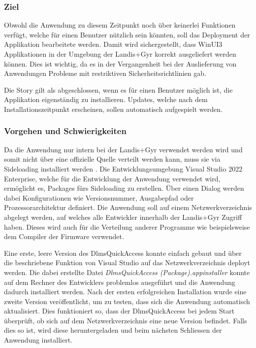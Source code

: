 \subsubsection{Ziel}
Obwohl die Anwendung zu diesem Zeitpunkt noch über keinerlei Funktionen verfügt, welche für einen Benutzer nützlich sein könnten, soll das Deployment der Applikation bearbeitete werden.
Damit wird sichergestellt, dass WinUI3 Applikationen in der Umgebung der Landis+Gyr korrekt ausgeliefert werden können.
Dies ist wichtig, da es in der Vergangenheit bei der Auslieferung von Anwendungen Probleme mit restriktiven Sicherheitsrichtlinien gab.

Die Story gilt als abgeschlossen, wenn es für einen Benutzer möglich ist, die Applikation eigenständig zu installieren.
Updates, welche nach dem Installationszeitpunkt erscheinen, sollen automatisch aufgespielt werden.

\subsubsection{Vorgehen und Schwierigkeiten}
Da die Anwendung nur intern bei der Landis+Gyr verwendet werden wird und somit nicht über eine offizielle Quelle verteilt werden kann, muss sie via Sideloading installiert werden \parencite{sideload}.
Die Entwicklungsumgebung Visual Studio 2022 Enterprise, welche für die Entwicklung der Anwendung verwendet wird, ermöglicht es, Packages fürs Sideloading zu erstellen.
Über einen Dialog werden dabei Konfigurationen wie Versionsnummer, Ausgabepfad oder Prozessorarchitektur definiert.
Die Anwendung soll auf einem Netzwerkverzeichnis abgelegt werden, auf welches alle Entwickler innerhalb der Landis+Gyr Zugriff haben.
Dieses wird auch für die Verteilung anderer Programme wie beispielsweise dem Compiler der Firmware verwendet.

Eine erste, leere Version des DlmsQuickAccess konnte einfach gebaut und über die beschriebene Funktion von Visual Studio auf das Netzwerkverzeichnis deployt werden.
Die dabei erstellte Datei \textit{DlmsQuickAccess (Package).appinstaller} konnte auf dem Rechner des Entwicklers problemlos ausgeführt und die Anwendung dadurch installiert werden.
Nach der ersten erfolgreichen Installation wurde eine zweite Version veröffentlicht, um zu testen, dass sich die Anwendung automatisch aktualisiert.
Dies funktioniert so, dass der DlmsQuickAccess bei jedem Start überprüft, ob sich auf dem Netzwerkverzeichnis eine neue Version befindet.
Falls dies so ist, wird diese heruntergeladen und beim nächsten Schliessen der Anwendung installiert.

